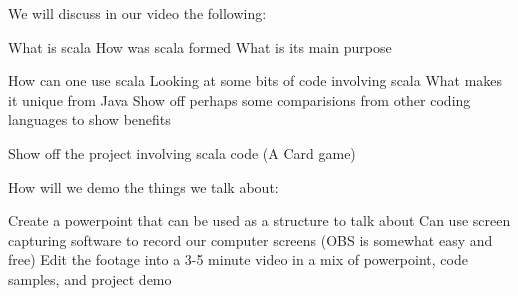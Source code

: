 We will discuss in our video the following:

  What is scala
  How was scala formed
  What is its main purpose
 
  How can one use scala
  Looking at some bits of code involving scala
  What makes it unique from Java
  Show off perhaps some comparisions from other coding languages to show benefits
  
  Show off the project involving scala code (A Card game)
  
How will we demo the things we talk about:
  
  Create a powerpoint that can be used as a structure to talk about
  Can use screen capturing software to record our computer screens (OBS is somewhat easy and free)
  Edit the footage into a 3-5 minute video in a mix of powerpoint, code samples, and project demo
  
